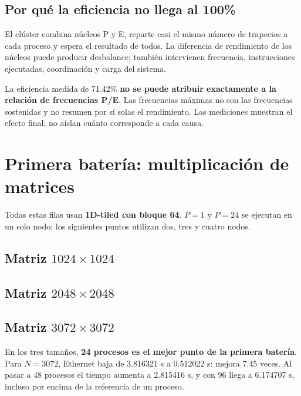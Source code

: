
\subsection{Por qué la eficiencia no llega al 100\%}
El clúster combina núcleos P y E, reparte casi el mismo número de trapecios a cada proceso y espera el resultado de todos. La diferencia de rendimiento de los núcleos puede producir desbalance; también intervienen frecuencia, instrucciones ejecutadas, coordinación y carga del sistema.

La eficiencia medida de 71.42\% \textbf{no se puede atribuir exactamente a la relación de frecuencias P/E}. Las frecuencias máximas no son las frecuencias sostenidas y no resumen por sí solas el rendimiento. Las mediciones muestran el efecto final; no aíslan cuánto corresponde a cada causa.

\section{Primera batería: multiplicación de matrices}

Todas estas filas usan \textbf{1D-tiled con bloque 64}. $P=1$ y $P=24$ se ejecutan en un solo nodo; los siguientes puntos utilizan dos, tres y cuatro nodos.

\subsection{Matriz \texorpdfstring{$1024\times1024$}{1024 x 1024}}


\subsection{Matriz \texorpdfstring{$2048\times2048$}{2048 x 2048}}


\subsection{Matriz \texorpdfstring{$3072\times3072$}{3072 x 3072}}


En los tres tamaños, \textbf{24 procesos es el mejor punto de la primera batería}. Para $N=3072$, Ethernet baja de 3.816321 s a 0.512022 s: mejora 7.45 veces. Al pasar a 48 procesos el tiempo aumenta a 2.815416 s, y con 96 llega a 6.174707 s, incluso por encima de la referencia de un proceso.

